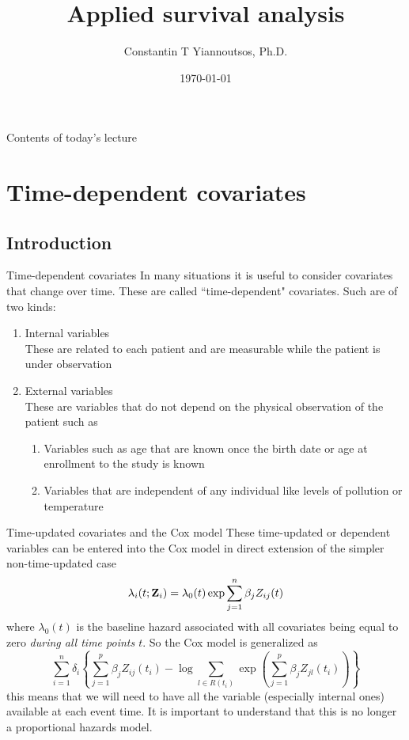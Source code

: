 \documentclass[envcountsect, 10pt, portrait, palatino]{beamer}
\title[]{Applied survival analysis}
\author[Constantin T Yiannoutsos]
{ Constantin T Yiannoutsos, Ph.D.}
\date[]{\today}
\newcommand{\bfZ}{{\mbox{{\bf Z}}}}
\begin{document}
\begin{frame}
  \titlepage
\end{frame}
\begin{frame}{Contents of today's lecture}
  \tableofcontents
\end{frame}
\section{Time-dependent covariates}
\subsection{Introduction}
\begin{frame}{ Time-dependent covariates}
In many situations it is useful to consider covariates that change over time.  These are called
``time-dependent" covariates.  Such are of two kinds:
\begin{enumerate}
\item Internal variables\\
These are related to each patient and are measurable while the patient is under observation
\item External variables\\
These are variables that do not depend on the physical observation of the patient such as
\begin{enumerate}
\item Variables such as age that are known once the birth date or age at enrollment to the study is known
\item Variables that are independent of any individual like levels of pollution or temperature
\end{enumerate}
\end{enumerate}
\end{frame}
\begin{frame}{Time-updated covariates and the Cox model}
These time-updated or dependent variables can be entered into the Cox model in direct extension of the
simpler non-time-updated case
$$
\lambda_i(t;\bfZ_i)=\lambda_0(t)\exp{\sum_{j=1}^n\beta_jZ_{ij}(t)}
$$
where $\lambda_0(t)$ is the baseline hazard associated with all covariates being equal to zero {\it during all
time points $t$}.  So the Cox model is generalized as
$$
\sum_{i=1}^n\delta_i\left \{ \sum_{j=1}^p\beta_jZ_{ij}(t_i)-\log\sum_{l\in R(t_i)}\exp\left (
\sum_{j=1}^p\beta_jZ_{jl}(t_i)\right )\right \}
$$
this means that we will need to have all the variable (especially internal ones) available at each event time.  It is important to understand that this is no longer a proportional hazards model.
\end{frame} 
\end{document}

